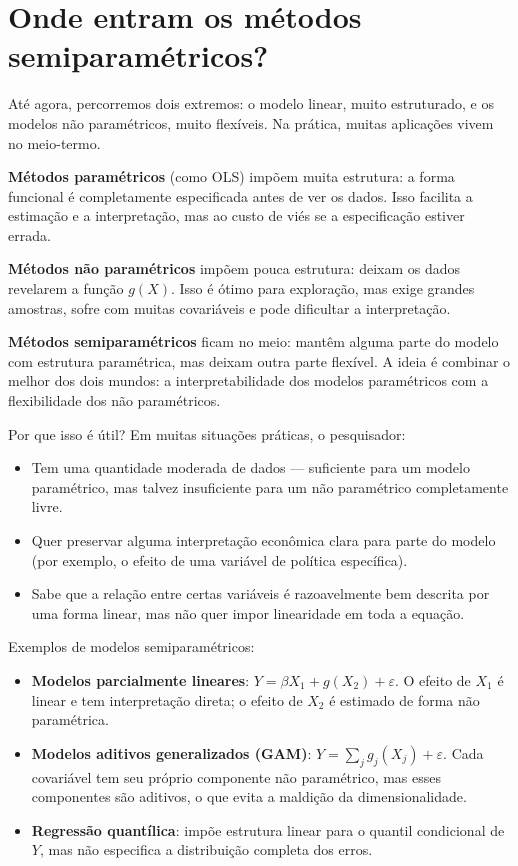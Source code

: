 \chapter{Onde entram os métodos semiparamétricos?}

Até agora, percorremos dois extremos: o modelo linear, muito estruturado, e os modelos
não paramétricos, muito flexíveis. Na prática, muitas aplicações vivem no meio-termo.

\textbf{Métodos paramétricos} (como OLS) impõem muita estrutura: a forma funcional é
completamente especificada antes de ver os dados. Isso facilita a estimação e a
interpretação, mas ao custo de viés se a especificação estiver errada.

\textbf{Métodos não paramétricos} impõem pouca estrutura: deixam os dados revelarem
a função $g(X)$. Isso é ótimo para exploração, mas exige grandes amostras, sofre com
muitas covariáveis e pode dificultar a interpretação.

\textbf{Métodos semiparamétricos} ficam no meio: mantêm alguma parte do modelo com
estrutura paramétrica, mas deixam outra parte flexível. A ideia é combinar o melhor
dos dois mundos: a interpretabilidade dos modelos paramétricos com a flexibilidade dos
não paramétricos.

Por que isso é útil? Em muitas situações práticas, o pesquisador:

\begin{itemize}
  \item Tem uma quantidade moderada de dados — suficiente para um modelo paramétrico,
  mas talvez insuficiente para um não paramétrico completamente livre.
  \item Quer preservar alguma interpretação econômica clara para parte do modelo
  (por exemplo, o efeito de uma variável de política específica).
  \item Sabe que a relação entre certas variáveis é razoavelmente bem descrita por
  uma forma linear, mas não quer impor linearidade em toda a equação.
\end{itemize}

Exemplos de modelos semiparamétricos:

\begin{itemize}
  \item \textbf{Modelos parcialmente lineares}: $Y = \beta X_1 + g(X_2) + \varepsilon$.
  O efeito de $X_1$ é linear e tem interpretação direta; o efeito de $X_2$ é estimado
  de forma não paramétrica.
  \item \textbf{Modelos aditivos generalizados (GAM)}: $Y = \sum_j g_j(X_j) + \varepsilon$.
  Cada covariável tem seu próprio componente não paramétrico, mas esses componentes são
  aditivos, o que evita a maldição da dimensionalidade.
  \item \textbf{Regressão quantílica}: impõe estrutura linear para o quantil condicional
  de $Y$, mas não especifica a distribuição completa dos erros.
\end{itemize}

